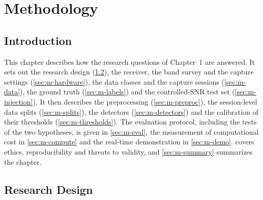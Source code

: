 \chapter{Methodology}
\label{chap:method}

%

\section{Introduction}
\label{sec:m-intro}

This chapter describes how the research questions of Chapter~1 are answered. It sets out the research design (\cref{sec:m-design}), the receiver, the band survey and the capture settings (\cref{sec:m-hardware}), the data classes and the capture sessions (\cref{sec:m-data}), the ground truth (\cref{sec:m-labels}) and the controlled-SNR test set (\cref{sec:m-injection}). It then describes the preprocessing (\cref{sec:m-preproc}), the session-level data splits (\cref{sec:m-splits}), the detectors (\cref{sec:m-detectors}) and the calibration of their thresholds (\cref{sec:m-thresholds}). The evaluation protocol, including the tests of the two hypotheses, is given in \cref{sec:m-eval}, the measurement of computational cost in \cref{sec:m-compute} and the real-time demonstration in \cref{sec:m-demo}.  covers ethics, reproducibility and threats to validity, and \cref{sec:m-summary} summarizes the chapter.

\section{Research Design}
\label{sec:m-design}

